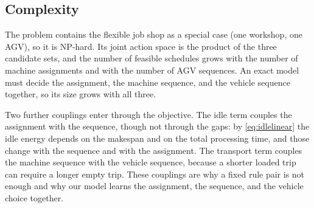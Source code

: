 \subsection{Complexity}

The problem contains the flexible job shop as a special case (one workshop,
one AGV), so it is NP-hard. Its joint action space is the product of the
three candidate sets, and the number of feasible schedules grows with the number
of machine assignments and with the number of AGV sequences. An exact model
must decide the assignment, the machine sequence, and the vehicle sequence
together, so its size grows with all three.

Two further couplings enter through the objective. The idle term couples the
assignment with the sequence, though not through the gaps: by
\eqref{eq:idlelinear} the idle energy depends on the makespan and on the total
processing time, and those change with the sequence and with the assignment.
The transport term
couples the machine sequence with the vehicle sequence, because a shorter
loaded trip can require a longer empty trip. These couplings are why a fixed
rule pair is not enough and why our model learns the assignment, the
sequence, and the vehicle choice together.
